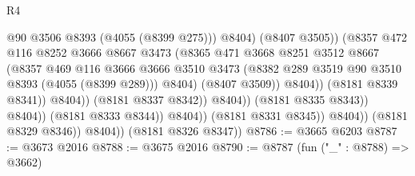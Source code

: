 \begin{lexlean}{R4}
\begin{coremodule}
                                                  @90
                                                  @3506
                                                  @8393
                                                  (@4055 (@8399 @275)))
                                                @8404)
                                              (@8407 @3505))
                                            (@8357
                                              @472
                                              @116
                                              @8252
                                              @3666
                                              @8667
                                              @3473
                                              (@8365
                                                @471
                                                @3668
                                                @8251
                                                @3512
                                                @8667
                                                (@8357
                                                  @469
                                                  @116
                                                  @3666
                                                  @3666
                                                  @3510
                                                  @3473
                                                  (@8382
                                                    @289
                                                    @3519
                                                    @90
                                                    @3510
                                                    @8393
                                                    (@4055 (@8399 @289)))
                                                  @8404)
                                                (@8407 @3509))
                                              @8404))
                                          (@8181 @8339 @8341))
                                        @8404))
                                    (@8181 @8337 @8342))
                                  @8404))
                              (@8181 @8335 @8343))
                            @8404))
                        (@8181 @8333 @8344))
                      @8404))
                  (@8181 @8331 @8345))
                @8404))
            (@8181 @8329 @8346))
          @8404))
      (@8181 @8326 @8347))
@8786 := @3665 @6203
@8787 := @3673 @2016
@8788 := @3675 @2016
@8790 := @8787 (fun ("_" : @8788) => @3662)

\end{coremodule}
\end{lexlean}
